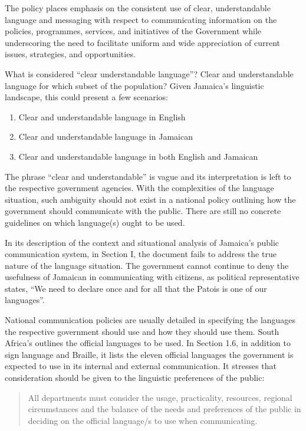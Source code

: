 \documentclass[output=paper,colorlinks,citecolor=brown]{langscibook}
\begin{document}
The policy places emphasis on the consistent use of clear, understandable language and messaging with respect to communicating information on the policies, programmes, services, and initiatives of the Government while underscoring the need to facilitate uniform and wide appreciation of current issues, strategies, and opportunities. \citep{GovernmentJamaicaCommunicationPolicy2015} 

What is considered “clear understandable language”? Clear and understandable language for which subset of the population? Given Jamaica’s linguistic landscape, this could present a few scenarios:

\begin{enumerate}
    \item Clear and understandable language in English
    \item Clear and understandable language in Jamaican
    \item Clear and understandable language in both English and Jamaican
\end{enumerate}

The phrase “clear and understandable” is vague and its interpretation is left to the respective government agencies. With the complexities of the language situation, such ambiguity should not exist in a national policy outlining how the government should communicate with the public. There are still no concrete guidelines on which language(s) ought to be used. 

In its description of the context and situational analysis of Jamaica’s public communication system, in Section I, the document fails to address the true nature of the language situation. The government cannot continue to deny the usefulness of Jamaican in communicating with citizens, as political representative \citet{Smith2012} states, “We need to declare once and for all that the Patois is one of our languages”. 

National communication policies are usually detailed in specifying the languages the respective government should use and how they should use them. South Africa's \citet{GovernmentCommunicationPolic2018} outlines the official languages to be used. In Section 1.6, in addition to sign language and Braille, it lists the eleven official languages the government is expected to use in its internal and external communication. It stresses that consideration should be given to the linguistic preferences of the public:

\begin{quote}
    All departments must consider the usage, practicality, resources, regional circumstances and the balance of the needs and preferences of the public in deciding on the official language/s to use when communicating. \citep[9]{GovernmentCommunicationPolic2018}
\end{quote}
\end{document}
